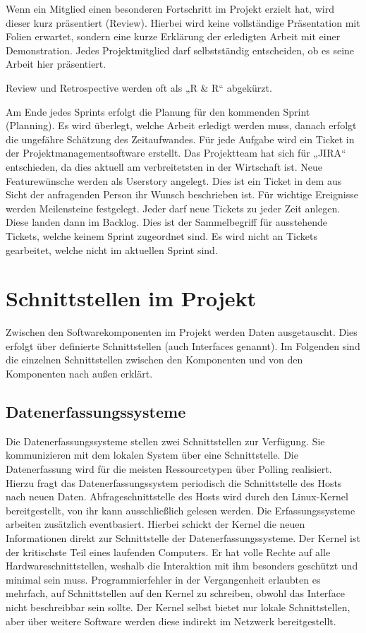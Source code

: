 Wenn ein Mitglied einen besonderen Fortschritt im Projekt erzielt hat, wird
dieser kurz präsentiert (Review). Hierbei wird keine vollständige Präsentation
mit Folien erwartet, sondern eine kurze Erklärung der erledigten Arbeit mit
einer Demonstration. Jedes Projektmitglied darf selbstständig entscheiden, ob
es seine Arbeit hier präsentiert.

Review und Retrospective werden oft als „R \& R“ abgekürzt.

Am Ende jedes Sprints erfolgt die Planung für den kommenden Sprint (Planning).
Es wird überlegt, welche Arbeit erledigt werden muss, danach erfolgt die
ungefähre Schätzung des Zeitaufwandes. Für jede Aufgabe wird ein Ticket in der
Projektmanagementsoftware erstellt. Das Projektteam hat sich für „JIRA“
entschieden, da dies aktuell am verbreitetsten in der Wirtschaft ist. Neue
Featurewünsche werden als Userstory angelegt. Dies ist ein Ticket in dem aus
Sicht der anfragenden Person ihr Wunsch beschrieben ist. Für wichtige
Ereignisse werden Meilensteine festgelegt. Jeder darf neue Tickets zu jeder
Zeit anlegen. Diese landen dann im \gls{Backlog}. Dies ist der Sammelbegriff
für ausstehende Tickets, welche keinem Sprint zugeordnet sind. Es wird nicht an
Tickets gearbeitet, welche nicht im aktuellen Sprint sind.
\tm%

\chapter{Schnittstellen im Projekt}
Zwischen den Softwarekomponenten im Projekt werden Daten ausgetauscht. Dies
erfolgt über definierte Schnittstellen (auch Interfaces genannt). Im Folgenden
sind die einzelnen Schnittstellen zwischen den Komponenten und von den
Komponenten nach außen erklärt.
\tm%

\section{Datenerfassungssysteme}
Die Datenerfassungssysteme stellen zwei Schnittstellen zur Verfügung. Sie
kommunizieren mit dem lokalen System über eine
 Schnittstelle. Die Datenerfassung wird
für die meisten Ressourcetypen über Polling realisiert. Hierzu fragt das
Datenerfassungssystem periodisch die Schnittstelle des Hosts nach neuen Daten.
Abfrageschnittstelle des Hosts wird durch den Linux-Kernel bereitgestellt, von
ihr kann ausschließlich gelesen werden. Die Erfassungssysteme arbeiten
zusätzlich eventbasiert. Hierbei schickt der Kernel die neuen Informationen
direkt zur Schnittstelle der Datenerfassungssysteme. Der Kernel ist der
kritischste Teil eines laufenden Computers. Er hat volle Rechte auf alle
Hardwareschnittstellen, weshalb die Interaktion mit ihm besonders geschützt und
minimal sein muss. Programmierfehler in der Vergangenheit erlaubten es
mehrfach, auf Schnittstellen auf den Kernel zu schreiben, obwohl das Interface
nicht beschreibbar sein sollte. Der Kernel selbst bietet nur lokale
Schnittstellen, aber über weitere Software werden diese indirekt im Netzwerk
bereitgestellt.

